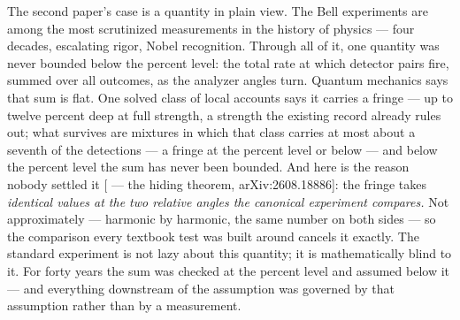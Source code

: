 The second paper's case is a quantity in plain view. The Bell
experiments are among the most scrutinized measurements in the
history of physics --- four decades, escalating rigor, Nobel
recognition. Through all of it, one quantity was never
bounded below the percent level: the total rate at which detector pairs
fire, summed over all outcomes, as the analyzer angles turn. Quantum
mechanics says that sum is flat. One solved class of local accounts
says it carries a fringe --- up to twelve percent deep at full strength,
a strength the existing record already rules out; what survives are
mixtures in which that class carries at most about a seventh of the
detections --- a fringe at the percent level or below --- and below the
percent level the sum has never been bounded. And here is the reason
nobody settled it {[} --- the hiding theorem, arXiv:2608.18886{]}:
the fringe takes \emph{identical values at the two relative angles the
canonical experiment compares.} Not approximately --- harmonic by
harmonic, the same number on both sides --- so the comparison every
textbook test was built around cancels it exactly. The standard
experiment is not lazy about this quantity; it is mathematically
blind to it. For forty years the sum was checked
at the percent level and assumed below it --- and everything downstream
of the assumption was governed by that assumption rather than by a
measurement.


